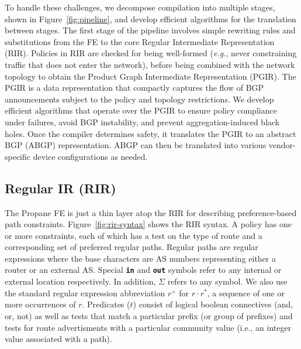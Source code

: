 \documentclass[10pt]{sigalternate052015}
\newcommand{\EG}{\emph{e.g.}}
\newcommand{\sysname}{{\small \sf Propane}\xspace}
\newcommand{\para}[1]{\paragraph*{\textbf{#1}}}
\newcommand{\CD}[1]{\texttt{\small #1}}  %
\newcommand{\KW}[1]{\texttt{\small\bfseries{#1}}}
\newcommand{\Prefer}{\texttt{>>}}
\newcommand{\Link}{\texttt{->}}
\newcommand{\In}{\KW{in}}
\newcommand{\Out}{\KW{out}}
\begin{document}
To handle these challenges, we decompose compilation into multiple stages, shown in  Figure~\ref{fig:pipeline}, and develop efficient algorithms for the translation between stages. The first stage of the pipeline involves simple rewriting rules and substitutions from the FE to the core Regular Intermediate Representation (RIR). Policies in RIR are checked for being well-formed (\EG, never constraining traffic that does not enter the network), before being combined with the network topology to obtain the Product Graph Intermediate Representation (PGIR). The PGIR is a data representation that compactly captures the flow of BGP announcements subject to the policy and topology restrictions. We develop efficient algorithms that operate over the PGIR to ensure policy compliance under failures, avoid BGP instability, and prevent aggregation-induced black holes. Once the compiler determines safety, it translates the PGIR to an abstract BGP (ABGP) representation. ABGP can then be translated into various vendor-specific device
configurations as needed.

\subsection{Regular IR (RIR)}
\label{sec:rir}

The \sysname FE is just a thin layer atop the RIR for describing preference-based path constraints.
Figure~\ref{fig:rir-syntax} shows the RIR syntax. A policy has one or more constraints, each of which has a test on the type of route and a corresponding set of preferred regular paths. Regular paths are regular expressions where the base characters are AS numbers representing either a router or an external AS. Special \In{} and \Out{} symbols refer to any internal or external location respectively. In addition, $\Sigma$ refers to any symbol. We also use the standard regular expression abbreviation $r^+$ for $r \cdot r^*$, a sequence of one or more occurrences of $r$. Predicates ($t$) consist of logical boolean connectives (and, or, not) as well as tests that match a particular prefix (or group of prefixes) and tests for route advertisments with a particular community value (i.e., an integer value associated with a path).
\end{document}
